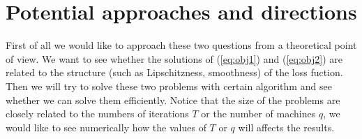 \documentclass{article}
\begin{document}
\section{Potential approaches and directions}
\label{sec:potential_direct}
First of all we would like to approach these two questions from a theoretical point of view. We want to see whether the solutions of (\ref{eq:obj1}) and (\ref{eq:obj2}) are related to the structure (such as Lipschitzness, smoothness) of the loss fuction. Then we will try to solve these two problems with certain algorithm and see whether we can solve them efficiently. Notice that the size of the problems are closely related to the numbers of iterations $T$ or the number of machines $q$, we would like to see numerically how the values of $T$ or $q$ will affects the results.



\end{document}
